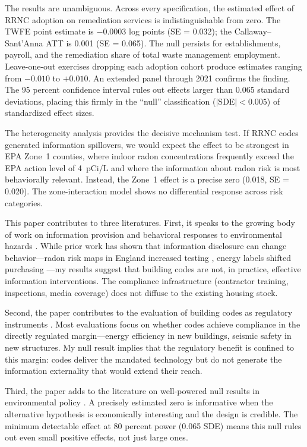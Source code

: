 \documentclass[12pt]{article}
\begin{document}
The results are unambiguous. Across every specification, the estimated effect of RRNC adoption on remediation services is indistinguishable from zero. The TWFE point estimate is $-0.0003$ log points (SE = 0.032); the Callaway--Sant'Anna ATT is 0.001 (SE = 0.065). The null persists for establishments, payroll, and the remediation share of total waste management employment. Leave-one-out exercises dropping each adoption cohort produce estimates ranging from $-0.010$ to $+0.010$. An extended panel through 2021 confirms the finding. The 95 percent confidence interval rules out effects larger than 0.065 standard deviations, placing this firmly in the ``null'' classification ($|$SDE$| < 0.005$) of standardized effect sizes.

The heterogeneity analysis provides the decisive mechanism test. If RRNC codes generated information spillovers, we would expect the effect to be strongest in EPA Zone~1 counties, where indoor radon concentrations frequently exceed the EPA action level of 4~pCi/L and where the information about radon risk is most behaviorally relevant. Instead, the Zone~1 effect is a precise zero (0.018, SE = 0.020). The zone-interaction model shows no differential response across risk categories.

This paper contributes to three literatures. First, it speaks to the growing body of work on information provision and behavioral responses to environmental hazards \citep{bennear2013information, dellavigna2009psychology}. While prior work has shown that information disclosure can change behavior---radon risk maps in England increased testing \citep{pinchbeck2023radon}, energy labels shifted purchasing \citep{newell2014nudging}---my results suggest that building codes are not, in practice, effective information interventions. The compliance infrastructure (contractor training, inspections, media coverage) does not diffuse to the existing housing stock.

Second, the paper contributes to the evaluation of building codes as regulatory instruments \citep{jacobsen2016evaluating, bruegge2019efficiency}. Most evaluations focus on whether codes achieve compliance in the directly regulated margin---energy efficiency in new buildings, seismic safety in new structures. My null result implies that the regulatory benefit is confined to this margin: codes deliver the mandated technology but do not generate the information externality that would extend their reach.

Third, the paper adds to the literature on well-powered null results in environmental policy \citep{greenstone2011did, graff2012impacts}. A precisely estimated zero is informative when the alternative hypothesis is economically interesting and the design is credible. The minimum detectable effect at 80 percent power (0.065 SDE) means this null rules out even small positive effects, not just large ones.
\end{document}
